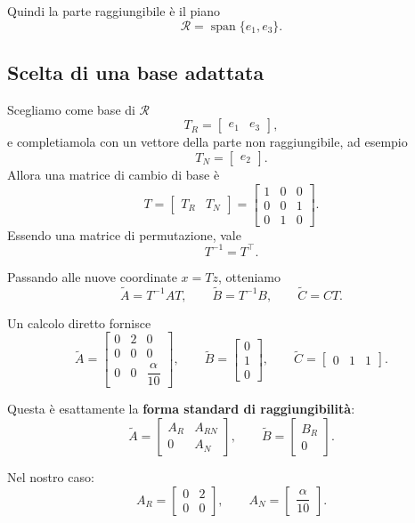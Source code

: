 Quindi la parte raggiungibile è il piano
\[
\mathcal R=\operatorname{span}\{e_1,e_3\}.
\]

\subsection{Scelta di una base adattata}

Scegliamo come base di \(\mathcal R\)
\[
T_R=\begin{bmatrix}e_1 & e_3\end{bmatrix},
\]
e completiamola con un vettore della parte non raggiungibile, ad esempio
\[
T_N=\begin{bmatrix}e_2\end{bmatrix}.
\]
Allora una matrice di cambio di base è
\[
T=\begin{bmatrix}T_R & T_N\end{bmatrix}
=
\begin{bmatrix}
1 & 0 & 0\\
0 & 0 & 1\\
0 & 1 & 0
\end{bmatrix}.
\]
Essendo una matrice di permutazione, vale
\[
T^{-1}=T^\top.
\]

Passando alle nuove coordinate \(x=Tz\), otteniamo
\[
\widetilde A=T^{-1}AT,
\qquad
\widetilde B=T^{-1}B,
\qquad
\widetilde C=CT.
\]

Un calcolo diretto fornisce
\[
\widetilde A=
\begin{bmatrix}
0 & 2 & 0\\
0 & 0 & 0\\
0 & 0 & \dfrac{\alpha}{10}
\end{bmatrix},
\qquad
\widetilde B=
\begin{bmatrix}
0\\1\\0
\end{bmatrix},
\qquad
\widetilde C=
\begin{bmatrix}
0 & 1 & 1
\end{bmatrix}.
\]

Questa è esattamente la \textbf{forma standard di raggiungibilità}:
\[
\widetilde A=
\begin{bmatrix}
A_R & A_{RN}\\
0 & A_N
\end{bmatrix},
\qquad
\widetilde B=
\begin{bmatrix}
B_R\\
0
\end{bmatrix}.
\]

Nel nostro caso:
\[
A_R=
\begin{bmatrix}
0 & 2\\
0 & 0
\end{bmatrix},
\qquad
A_N=
\begin{bmatrix}
\dfrac{\alpha}{10}
\end{bmatrix}.
\]

